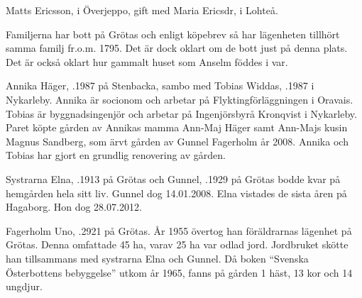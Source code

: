 Matts Ericsson,  i Överjeppo, gift med Maria Ericsdr,  i Lohteå.
\begin{jhchildren}
  \item {}
  \item {}
  \item {}
  \item {}
  \item {}
  \item {}
  \item {}
  \item {}
  \item {}
  \item {}
\end{jhchildren}
Familjerna har bott på Grötas och  enligt köpebrev så har lägenheten tillhört samma familj fr.o.m. 1795. Det är dock oklart om de bott just på denna plats. Det är också oklart hur gammalt huset som Anselm föddes i var.




Annika Häger, .1987 på Stenbacka, sambo med Tobias Widdas, .1987 i Nykarleby. Annika är socionom och arbetar på Flyktingförläggningen i Oravais. Tobias är byggnadsingenjör och arbetar på Ingenjörsbyrå Kronqvist i Nykarleby. Paret köpte gården av Annikas mamma Ann-Maj Häger samt Ann-Majs kusin Magnus Sandberg, som ärvt gården av Gunnel Fagerholm år 2008. Annika och Tobias har gjort en grundlig renovering av gården.


Systrarna Elna, .1913 på Grötas och Gunnel, .1929 på Grötas bodde kvar på hemgården hela sitt liv. Gunnel dog 14.01.2008. Elna vistades de sista åren på Hagaborg. Hon dog 28.07.2012.




Fagerholm Uno, .2921 på Grötas. År 1955 övertog han föräldrarnas lägenhet på Grötas. Denna omfattade 45 ha, varav 25 ha var odlad jord. Jordbruket skötte han tillsammans med systrarna Elna och Gunnel. Då boken ``Svenska Österbottens bebyggelse'' utkom år 1965, fanns på gården 1 häst, 13 kor och 14 ungdjur.

